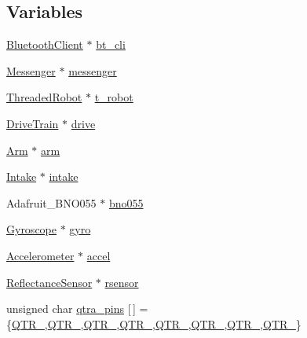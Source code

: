 \subsection*{Variables}
\begin{DoxyCompactItemize}
\item 
\hyperlink{class_bluetooth_client}{Bluetooth\+Client} $\ast$ \hyperlink{rbe2001_8ino_ae2ff51c6b65a5b568253ca01270200bc}{bt\+\_\+cli}
\item 
\hyperlink{class_messenger}{Messenger} $\ast$ \hyperlink{rbe2001_8ino_a48342badc24a04d2310ca16ff4a3711b}{messenger}
\item 
\hyperlink{class_threaded_robot}{Threaded\+Robot} $\ast$ \hyperlink{rbe2001_8ino_a5356aea93c7a0c5118c1294971a0c68d}{t\+\_\+robot}
\item 
\hyperlink{class_drive_train}{Drive\+Train} $\ast$ \hyperlink{rbe2001_8ino_a4f1a93864d6efcbbe55f30028655e7ad}{drive}
\item 
\hyperlink{class_arm}{Arm} $\ast$ \hyperlink{rbe2001_8ino_a0f9200eb3ef3d09764dc39b137dc9f45}{arm}
\item 
\hyperlink{class_intake}{Intake} $\ast$ \hyperlink{rbe2001_8ino_ab0ec7e650c93e5f5c9b4d6490cf9328a}{intake}
\item 
Adafruit\+\_\+\+B\+N\+O055 $\ast$ \hyperlink{rbe2001_8ino_ab36eee53161180375c1855b5917ec0f9}{bno055}
\item 
\hyperlink{class_gyroscope}{Gyroscope} $\ast$ \hyperlink{rbe2001_8ino_a8b50650397dca0a575b97ce4cbf21e34}{gyro}
\item 
\hyperlink{class_accelerometer}{Accelerometer} $\ast$ \hyperlink{rbe2001_8ino_a40e268acbd6a40e1d49f995404b85d0b}{accel}
\item 
\hyperlink{class_reflectance_sensor}{Reflectance\+Sensor} $\ast$ \hyperlink{rbe2001_8ino_aec14d311939d778664c04e32ca91a864}{rsensor}
\item 
unsigned char \hyperlink{rbe2001_8ino_a5b4fcadc7c7d5da32f396d144180a048}{qtra\+\_\+pins} \mbox{[}$\,$\mbox{]} = \{\hyperlink{config_8h_a78fa539ebb20148cbfcad00742561cf6}{Q\+T\+R\+\_},\hyperlink{config_8h_a49fbc5f0ba729444355eb9ce3588aa40}{Q\+T\+R\+\_},\hyperlink{config_8h_ae5dcb2e48b67f90a48eddc8d7f1b44ea}{Q\+T\+R\+\_},\hyperlink{config_8h_a1e52ef437d8700013af2088d388a1cf3}{Q\+T\+R\+\_},\hyperlink{config_8h_ad90df5df0b2368d826186652cfbe236a}{Q\+T\+R\+\_},\hyperlink{config_8h_ab683ec86911bbd120c0623b121046420}{Q\+T\+R\+\_},\hyperlink{config_8h_a5b8ce3aa53de77253e04c5d0eecf97db}{Q\+T\+R\+\_},\hyperlink{config_8h_a6eef11bb690916992e7933e0ae8e2047}{Q\+T\+R\+\_}\}

\end{DoxyCompactItemize}
